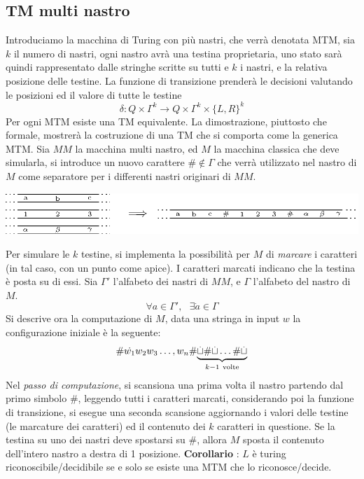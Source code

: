 \documentclass[10pt, letterpaper]{report}
\begin{document}
\subsection{TM multi nastro}\label{TMmultinastro}
Introduciamo la macchina di Turing con più nastri, che verrà 
denotata MTM, 
sia $k$ il numero di nastri, ogni nastro avrà 
una testina proprietaria, uno stato sarà quindi rappresentato 
dalle stringhe scritte su tutti e $k$ i nastri, e la relativa 
posizione delle testine. \acc 
La funzione di transizione prenderà le decisioni valutando le posizioni 
ed il valore di tutte le testine 
$$ \delta : Q\times\Gamma^k\rightarrow Q\times\Gamma^k\times \{L,R\}^k$$
 Per ogni MTM esiste una TM equivalente.\acc 
\dimo{} La dimostrazione, piuttosto che formale, mostrerà la costruzione di una 
TM che si comporta come la generica MTM.\acc 
Sia $MM$ la macchina multi nastro, ed $M$ la macchina classica 
 che deve simularla, si introduce un nuovo carattere $\#\notin \Gamma$
 che verrà utilizzato nel nastro di $M$ come separatore per i 
differenti nastri originari di $MM$.\begin{center}
    \includegraphics[width=\textwidth ]{images/multinastro.eps}
\end{center}
Per simulare le $k$ testine, si implementa la possibilità per $M$ 
di \textit{marcare} i caratteri (in tal caso, con un punto come 
apice). I caratteri marcati indicano che la testina è posta su di essi. Sia $\Gamma'$ l'alfabeto dei nastri di $MM$, e 
$\Gamma$ l'alfabeto del nastro di $M$.
$$\forall a\in\Gamma', \ \ \ \exists \dot{a} \in\Gamma$$
Si descrive ora la computazione di $M$, data una stringa 
in input $w$ la configurazione iniziale è la seguente: 
$$\#\dot{w_1}w_2w_3\dots,w_n\# 
\smash{\underbrace{\dot{\blank}\#\dot{\blank}\dots \#\dot{\blank}}_{k-1\ \text{volte}}}
$$
\\ 
Nel \textit{passo di computazione}, 
si scansiona una prima volta il nastro 
partendo dal primo simbolo $\#$, leggendo tutti i 
caratteri marcati, considerando poi la funzione di 
transizione, si esegue una seconda scansione aggiornando i 
valori delle testine (le marcature dei caratteri) ed il contenuto 
dei $k$ caratteri in questione. Se la testina su uno dei nastri deve 
spostarsi su $\#$, allora $M$ sposta il contenuto dell'intero nastro a destra di 1 posizione.\acc 
\textbf{Corollario} : $L$ è turing riconoscibile/decidibile se e solo se esiste una MTM che lo riconosce/decide.
\end{document}
